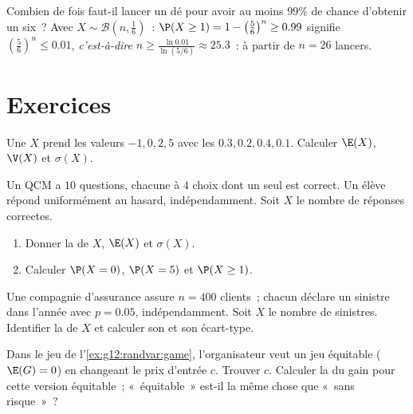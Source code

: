 \begin{example}\label{ex:g12:randvar:atleastone}
Combien de fois faut-il lancer un dé pour avoir au moins $99\%$ de chance
d'obtenir un six~? Avec $X \sim \mathcal B\left(n, \frac16\right)$~:
$\P(X \geq 1) = 1 - \left(\frac56\right)^n \geq 0.99$ signifie
$\left(\frac56\right)^n \leq 0.01$, \emph{c'est-à-dire}
$n \geq \frac{\ln 0.01}{\ln(5/6)} \approx 25.3$~: à partir de $n = 26$
lancers.
\end{example}

\section{Exercices}

\begin{exercise}[$\star$]\label{exo:g12:randvar:1}
Une  $X$ prend les valeurs $-1, 0, 2, 5$ avec les
 $0.3, 0.2, 0.4, 0.1$. Calculer $\E(X)$, $\V(X)$ et
$\sigma(X)$.
\end{exercise}

\begin{exercise}[$\star$]\label{exo:g12:randvar:2}
Un QCM a $10$ questions, chacune à $4$ choix dont un seul est correct. Un
élève répond uniformément au hasard, indépendamment. Soit $X$ le nombre de
réponses correctes.
\begin{enumerate}
  \item Donner la  de $X$, $\E(X)$ et $\sigma(X)$.
  \item Calculer $\P(X = 0)$, $\P(X = 5)$ et $\P(X \geq 1)$.
\end{enumerate}
\end{exercise}

\begin{exercise}[$\star$]\label{exo:g12:randvar:3}
Une compagnie d'assurance assure $n = 400$ clients~; chacun déclare un
sinistre dans l'année avec  $p = 0.05$, indépendamment. Soit $X$
le nombre de sinistres. Identifier la  de $X$ et calculer son 
et son écart-type.
\end{exercise}

\begin{exercise}[$\star\star$]\label{exo:g12:randvar:4}
Dans le jeu de l'\cref{ex:g12:randvar:game}, l'organisateur veut un jeu
équitable ($\E(G) = 0$) en changeant le prix d'entrée $c$. Trouver $c$.
Calculer la  du gain pour cette version équitable~; «~équitable~»
est-il la même chose que «~sans risque~»~?
\end{exercise}

